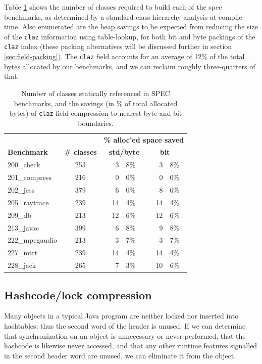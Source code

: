 \documentclass[preprint]{acmconf}
\begin{document}
Table \ref{tab:claz-space} shows the number of classes required to
build each of
the spec benchmarks, as determined by a standard class hierarchy
analysis at compile-time.  Also enumerated are the heap savings to be
expected from reducing the size of the {\tt claz} information using
table-lookup, for both bit and byte packings of the {\tt claz} index
(these packing alternatives will be discussed further in
section \ref{sec:field-packing}).  The {\tt claz} field accounts for an
average of 12\% of the total bytes allocated by our benchmarks, and we
can reclaim roughly three-quarters of that.
\begin{table}
\begin{tabular}{lcr@{.}lr@{.}l}
&& \multicolumn{4}{c}{\bf \% alloc'ed space saved} \\
\bf Benchmark &\bf \# classes & \multicolumn{2}{c}{\bf std/byte} &
                             \multicolumn{2}{l}{\bf~~bit} \\ \hline
200\_check	& 253 &  3&8\% &  3&8\% \\
201\_compress	& 216 &  0&0\% &  0&0\% \\
202\_jess	& 379 &  6&0\% &  8&6\% \\
205\_raytrace	& 239 & 14&4\% & 14&4\% \\
209\_db 	& 213 & 12&6\% & 12&6\% \\
213\_javac	& 399 &  6&8\% &  9&8\% \\
222\_mpegaudio	& 213 &  3&7\% &  3&7\% \\
227\_mtrt	& 239 & 14&4\% & 14&4\% \\
228\_jack	& 265 &  7&3\% & 10&6\% \\
\end{tabular}
\caption{Number of classes statically referenced in SPEC benchmarks,
  and the savings (in \% of total allocated bytes) of {\tt claz} field
  compression to nearest byte and bit boundaries.}
\label{tab:claz-space}
\end{table}

\subsection{Hashcode/lock compression}
Many objects in a typical Java program are neither locked nor inserted
into hashtables; thus the second word of the header is unused.
If we can determine that synchronization on an object is unnecessary
or never performed, that the hashcode is likewise never accessed,
and that any other runtime features signalled in the second header
word are unused, we can eliminate it from the object.
\end{document}
